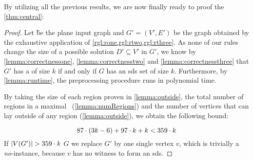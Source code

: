 \noindent By utilizing all the previous results, we are now finally ready to proof the \cref{thm:central}: 

\centraltheo*

\begin{proof}
    Let \G be the plane input graph and $G'=(V',E')$ be the graph obtained by the exhaustive application of \cref{rgl:rone,rgl:rtwo,rgl:rthree}.
    As none of our rules change the size of a possible solution $D' \subseteq V'$ in $G'$, we know by \cref{lemma:correctnessone}, \cref{lemma:correctnesstwo} and \cref{lemma:correctnessthree} that $G'$ has a \sdom of size $k$ if and only if $G$ has an sds set of size $k$.
    Furthermore, by \cref{lemma:runtime}, the preprocessing procedure runs in polynomial time.
    
    By taking the size of each region proven in \cref{lemma:outside}, the total number of regions in a maximal \dreg~(\cref{lemma:numRegions}) and the number of vertices that can lay outside of any region (\cref{lemma:outside}), we obtain the following bound:
    
    \begin{equation}
         87 \cdot (3k - 6) + 97 \cdot k + k < 359 \cdot k
    \end{equation}
    \noindent If $\abs{V(G')} > 359 \cdot k$ $G$ we replace $G'$ by one single vertex $v$, which is trivially a \emph{no}-instance, because $v$ has no witness to form an sds.

\end{proof}